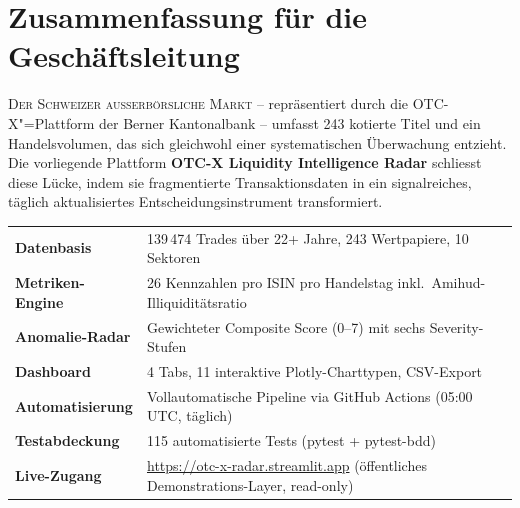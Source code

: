 \documentclass[11pt, a4paper, oneside, openany]{report}
\begin{document}
\clearpage

\chapter*{Zusammenfassung für die Geschäftsleitung}

\lettrine[lines=3, lraise=0.1, findent=3pt, nindent=0pt]{\textcolor{SwissRed}{D}}{er Schweizer ausserbörsliche Markt} -- repräsentiert durch die OTC-X"=Plattform der Berner Kantonalbank -- umfasst 243 kotierte Titel und ein Handelsvolumen, das sich gleichwohl einer systematischen Überwachung entzieht. Die vorliegende Plattform \textbf{OTC-X Liquidity Intelligence Radar} schliesst diese Lücke, indem sie fragmentierte Transaktionsdaten in ein signalreiches, täglich aktualisiertes Entscheidungsinstrument transformiert.

\begin{table}[H]
\centering
\sffamily\small
\begin{tabularx}{\textwidth}{>{\bfseries\sffamily\color{SwissRed}}l X}
  \toprule
  Datenbasis        & 139\,474 Trades über 22+ Jahre, 243 Wertpapiere, 10 Sektoren \\
  Metriken-Engine   & 26 Kennzahlen pro ISIN pro Handelstag inkl.\ Amihud-Illiquiditätsratio \\
  Anomalie-Radar    & Gewichteter Composite Score (0--7) mit sechs Severity-Stufen \\
  Dashboard         & 4 Tabs, 11 interaktive Plotly-Charttypen, CSV-Export \\
  Automatisierung   & Vollautomatische Pipeline via GitHub Actions (05:00\,UTC, täglich) \\
  Testabdeckung     & 115 automatisierte Tests (pytest + pytest-bdd) \\
  Live-Zugang       & \url{https://otc-x-radar.streamlit.app} (öffentliches Demonstrations-Layer, read-only) \\
  \bottomrule
\end{tabularx}
\end{table}
\end{document}
